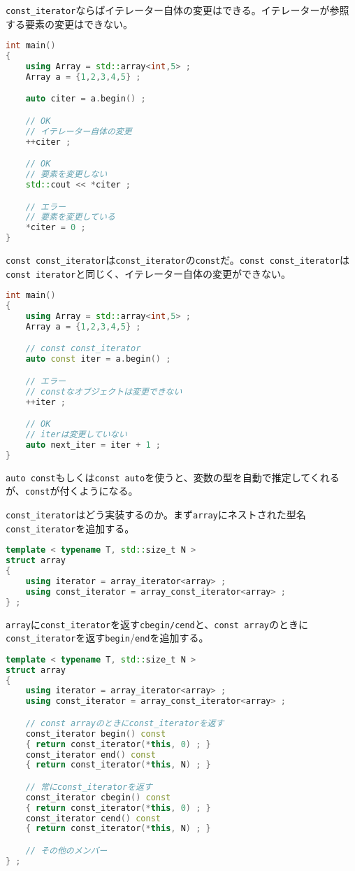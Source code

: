 \texttt{const\_iterator}ならばイテレーター自体の変更はできる。イテレーターが参照する要素の変更はできない。

\begin{lstlisting}[language={C++}]
int main()
{
    using Array = std::array<int,5> ;
    Array a = {1,2,3,4,5} ;

    auto citer = a.begin() ;

    // OK
    // イテレーター自体の変更
    ++citer ;

    // OK
    // 要素を変更しない
    std::cout << *citer ;

    // エラー
    // 要素を変更している
    *citer = 0 ;
}
\end{lstlisting}

\texttt{const const\_iterator}は\texttt{const\_iterator}の\texttt{const}だ。\texttt{const const\_iterator}は\texttt{const iterator}と同じく、イテレーター自体の変更ができない。

\begin{lstlisting}[language={C++}]
int main()
{
    using Array = std::array<int,5> ;
    Array a = {1,2,3,4,5} ;

    // const const_iterator
    auto const iter = a.begin() ;

    // エラー
    // constなオブジェクトは変更できない
    ++iter ;

    // OK
    // iterは変更していない
    auto next_iter = iter + 1 ;
}
\end{lstlisting}

\texttt{auto const}もしくは\texttt{const auto}を使うと、変数の型を自動で推定してくれるが、\texttt{const}が付くようになる。

\texttt{const\_iterator}はどう実装するのか。まず\texttt{array}にネストされた型名\texttt{const\_iterator}を追加する。

\begin{lstlisting}[language={C++}]
template < typename T, std::size_t N >
struct array
{
    using iterator = array_iterator<array> ;
    using const_iterator = array_const_iterator<array> ;
} ;
\end{lstlisting}

\texttt{array}に\texttt{const\_iterator}を返す\texttt{cbegin/cend}と、\texttt{const array}のときに\texttt{const\_iterator}を返す\texttt{begin}/\texttt{end}を追加する。

\begin{lstlisting}[language={C++}]
template < typename T, std::size_t N >
struct array
{
    using iterator = array_iterator<array> ;
    using const_iterator = array_const_iterator<array> ;

    // const arrayのときにconst_iteratorを返す
    const_iterator begin() const
    { return const_iterator(*this, 0) ; }
    const_iterator end() const
    { return const_iterator(*this, N) ; }

    // 常にconst_iteratorを返す
    const_iterator cbegin() const
    { return const_iterator(*this, 0) ; }
    const_iterator cend() const
    { return const_iterator(*this, N) ; }

    // その他のメンバー
} ;
\end{lstlisting}

